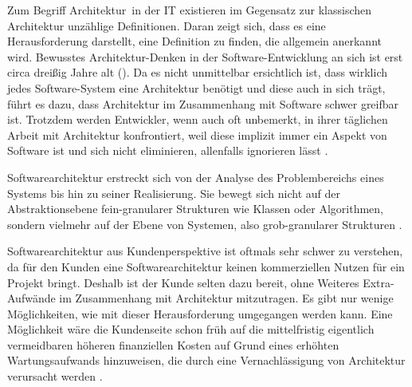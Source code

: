 Zum Begriff \glqq Architektur\grqq\ in der IT existieren im Gegensatz zur klassischen Architektur unzählige Definitionen. Daran zeigt sich, dass es eine Herausforderung darstellt, eine Definition zu finden, die allgemein anerkannt wird. Bewusstes Architektur-Denken in der Software-Entwicklung an sich ist erst circa dreißig Jahre alt (\citereset \autocite{Shaw.1996}). Da es nicht unmittelbar ersichtlich ist, dass wirklich jedes Software-System eine Architektur benötigt und diese auch in sich trägt, führt es dazu, dass Architektur im Zusammenhang mit Software schwer greifbar ist. Trotzdem werden Entwickler, wenn auch oft unbemerkt, in ihrer täglichen Arbeit mit Architektur konfrontiert, weil diese implizit immer ein Aspekt von Software ist und sich nicht eliminieren, allenfalls ignorieren lässt \citereset \autocite{Vogel.2009}.

Softwarearchitektur erstreckt sich von der Analyse des Problembereichs eines Systems bis hin zu seiner Realisierung. Sie bewegt sich nicht auf der Abstraktionsebene fein-granularer Strukturen wie Klassen oder Algorithmen, sondern vielmehr auf der Ebene von Systemen, also grob-granularer Strukturen \citereset \autocite{Vogel.2009}.

Softwarearchitektur aus Kundenperspektive ist oftmals sehr schwer zu verstehen, da für den Kunden eine Softwarearchitektur keinen kommerziellen Nutzen für ein Projekt bringt. Deshalb ist der Kunde selten dazu bereit, ohne Weiteres Extra-Aufwände im Zusammenhang mit Architektur mitzutragen. Es gibt nur wenige Möglichkeiten, wie mit dieser Herausforderung umgegangen werden kann. Eine Möglichkeit wäre die Kundenseite schon früh auf die mittelfristig eigentlich vermeidbaren höheren finanziellen Kosten auf Grund eines erhöhten Wartungsaufwands hinzuweisen, die durch eine Vernachlässigung von Architektur verursacht werden \citereset \autocite{Vogel.2009}.

